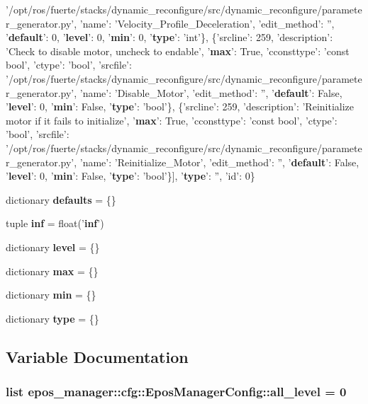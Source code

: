 \begin{DoxyCompactItemize}
'/opt/ros/fuerte/stacks/dynamic\-\_\-reconfigure/src/dynamic\-\_\-reconfigure/parameter\-\_\-generator.\-py', 'name'\-: '\-Velocity\-\_\-\-Profile\-\_\-\-Deceleration', 'edit\-\_\-method'\-: '', '{\bf default}'\-: 0, '{\bf level}'\-: 0, '{\bf min}'\-: 0, '{\bf type}'\-: 'int'\}, \{'srcline'\-: 259, 'description'\-: '\-Check to disable motor, uncheck to endable', '{\bf max}'\-: \-True, 'cconsttype'\-: 'const bool', 'ctype'\-: 'bool', 'srcfile'\-: '/opt/ros/fuerte/stacks/dynamic\-\_\-reconfigure/src/dynamic\-\_\-reconfigure/parameter\-\_\-generator.\-py', 'name'\-: '\-Disable\-\_\-\-Motor', 'edit\-\_\-method'\-: '', '{\bf default}'\-: \-False, '{\bf level}'\-: 0, '{\bf min}'\-: \-False, '{\bf type}'\-: 'bool'\}, \{'srcline'\-: 259, 'description'\-: '\-Reinitialize motor if it fails to initialize', '{\bf max}'\-: \-True, 'cconsttype'\-: 'const bool', 'ctype'\-: 'bool', 'srcfile'\-: '/opt/ros/fuerte/stacks/dynamic\-\_\-reconfigure/src/dynamic\-\_\-reconfigure/parameter\-\_\-generator.\-py', 'name'\-: '\-Reinitialize\-\_\-\-Motor', 'edit\-\_\-method'\-: '', '{\bf default}'\-: \-False, '{\bf level}'\-: 0, '{\bf min}'\-: \-False, '{\bf type}'\-: 'bool'\}], '{\bf type}'\-: '', 'id'\-: 0\}
\item 
dictionary {\bf defaults} = \{\}
\item 
tuple {\bf inf} = float('{\bf inf}')
\item 
dictionary {\bf level} = \{\}
\item 
dictionary {\bf max} = \{\}
\item 
dictionary {\bf min} = \{\}
\item 
dictionary {\bf type} = \{\}
\end{DoxyCompactItemize}


\subsection{\-Variable \-Documentation}
\subsubsection[{all\-\_\-level}]{\setlength{\rightskip}{0pt plus 5cm}list {\bf epos\-\_\-manager\-::cfg\-::\-Epos\-Manager\-Config\-::all\-\_\-level} = 0}\label{namespaceepos__manager_1_1cfg_1_1EposManagerConfig_ad849de70f10043e44acf5efe5ef5131e}


